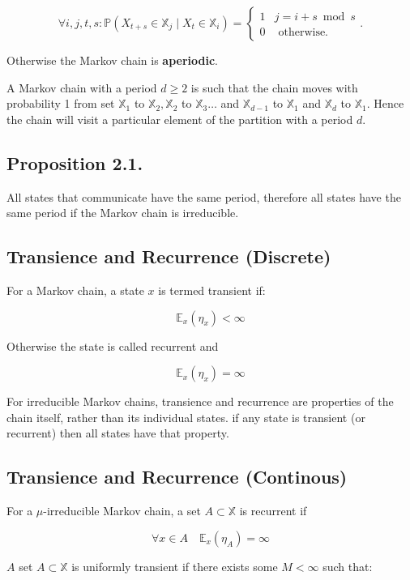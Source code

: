 \documentclass[10pt]{article}
\begin{document}
$$
\forall i, j, t, s: \mathbb{P}\left(X_{t+s} \in \mathbb{X}_{j} \mid X_{t} \in \mathbb{X}_{i}\right)=\left\{\begin{array}{ll}
1 & j=i+s \bmod s \\
0 & \text { otherwise. }
\end{array} .\right.
$$

Otherwise the Markov chain is \textbf{aperiodic}.

A Markov chain with a period $d \geq 2$ is such that the chain moves with probability 1 from set $\mathbb{X}_{1}$ to $\mathbb{X}_{2}, \mathbb{X}_{2}$ to $\mathbb{X}_{3} \ldots$ and $\mathbb{X}_{d-1}$ to $\mathbb{X}_{1}$ and $\mathbb{X}_{d}$ to $\mathbb{X}_{1}$. Hence the chain will visit a particular element of the partition with a period $d$.

\subsection{Proposition 2.1.}
All states that communicate have the same period, therefore all states have the same period if the Markov chain is irreducible.

\subsection{Transience and Recurrence (Discrete)}
 For a Markov chain, a state $x$ is termed transient if:

$$
\mathbb{E}_{x}\left(\eta_{x}\right)<\infty
$$

Otherwise the state is called recurrent and

$$
\mathbb{E}_{x}\left(\eta_{x}\right)=\infty
$$

For irreducible Markov chains, transience and recurrence are properties of the chain itself, rather than its individual states. if any state is transient (or recurrent) then all states have that property.

\subsection{Transience and Recurrence (Continous)}
For a $\mu$-irreducible Markov chain, a set $A \subset \mathbb{X}$ is recurrent if

$$
\forall x \in A \quad \mathbb{E}_{x}\left(\eta_{A}\right)=\infty
$$

$A$ set $A \subset \mathbb{X}$ is uniformly transient if there exists some $M<\infty$ such that:
\end{document}
